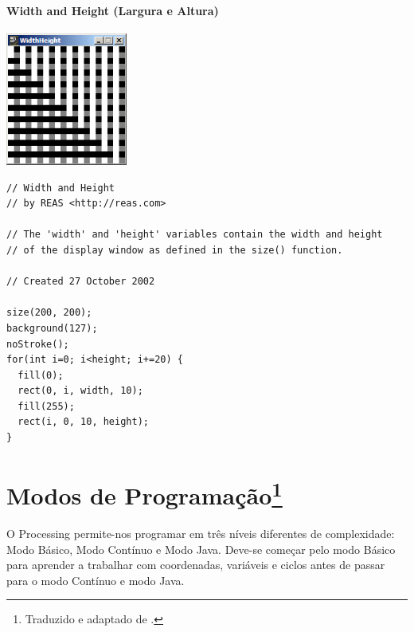 \paragraph{Width and Height (Largura e Altura)}
\begin{center}
\includegraphics[width=4cm]{images/exemploWidthHeight.eps}
\end{center}
\begin{lstlisting}
// Width and Height
// by REAS <http://reas.com>

// The 'width' and 'height' variables contain the width and height 
// of the display window as defined in the size() function.

// Created 27 October 2002

size(200, 200);
background(127);
noStroke();
for(int i=0; i<height; i+=20) {
  fill(0);
  rect(0, i, width, 10);
  fill(255);
  rect(i, 0, 10, height);
}
\end{lstlisting}



\section[Modos de Programação]{Modos de Programação\protect\footnote{Traduzido e adaptado de \cite{Processing.orgProcessingEnvironmentVisitadoJaneiro2007}.}}
O Processing permite-nos programar em três níveis diferentes de complexidade: Modo Básico,
Modo Contínuo e Modo Java.
Deve-se começar pelo modo Básico para aprender a trabalhar com coordenadas, variáveis e ciclos antes
de passar para o modo Contínuo e modo Java.

